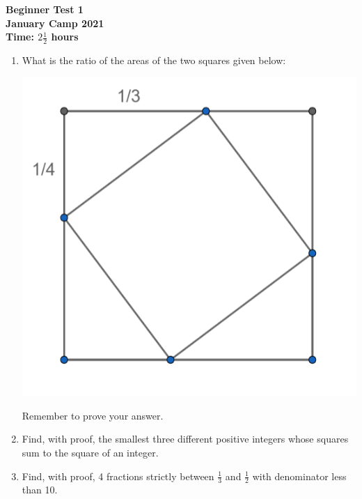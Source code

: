 \documentclass{article}
\begin{document}
\thispagestyle{empty}

\begin{center}
  \textbf{\Large Beginner Test 1}
  \\ \vspace{1em}
  \textbf{\large January Camp 2021}
  \\ \vspace{1em}
  \textbf{\large Time: $2\frac{1}{2}$ hours}
\end{center}

\vspace{24pt}

\begin{enumerate}[1.]


\item What is the ratio of the areas of the two squares given below:
	\begin{center}
	\includegraphics[scale=0.4]{beginner_test_1_img_2.png}	
	\end{center}
Remember to prove your answer.


\item Find, with proof, the smallest three different positive integers whose squares sum to the square of an integer. %


\item Find, with proof, 4 fractions strictly between $\frac{1}{3}$ and $\frac{1}{2}$ with denominator less than 10. %



\end{enumerate}
\end{document}
